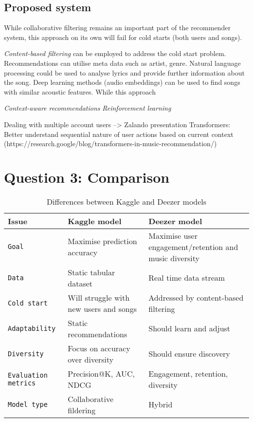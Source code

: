 \documentclass[
]{ceurart}
\begin{document}
\subsection{Proposed system}

While collaborative filtering remains an important part of the recommender system, this approach on its own will fail for cold starts (both users and songs). 

\textit{Content-based filtering} can be employed to address the cold start problem. Recommendations can utilise meta data such as artist, genre. Natural language processing could be used to analyse lyrics and provide further information about the song. Deep learning methods (audio embeddings) can be used to find songs with similar acoustic features. While this approach 

\textit{Context-aware recommendations}
\textit{Reinforcement learning}

Dealing with multiple account users --> Zalando presentation
Transformers: Better understand sequential nature of user actions based on current context (https://research.google/blog/transformers-in-music-recommendation/)



\section{Question 3: Comparison}



\begin{table}
  \caption{Differences between Kaggle and Deezer models}
  \label{tab:differences}
  \begin{tabular}{lll}
    \toprule
    Issue & Kaggle model & Deezer model\\
    \midrule
    \texttt{Goal} & Maximise prediction accuracy& Maximise user engagement/retention and music diversity \\
    \texttt{Data}& Static tabular dataset & Real time data stream\\
    \texttt{Cold start}& Will struggle with new users and songs& Addressed by content-based filtering\\
    \texttt{Adaptability}& Static recommendations & Should learn and adjust\\
    \texttt{Diversity}& Focus on accuracy over diversity & Should ensure discovery\\
    \texttt{Evaluation metrics}& Precision@K, AUC, NDCG & Engagement, retention, diversity\\
    \texttt{Model type}& Collaborative fildering & Hybrid\\
    \bottomrule
  \end{tabular}
\end{table}
\end{document}
